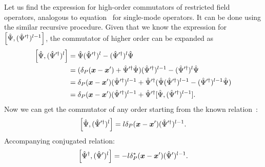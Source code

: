 Let us find the expression for high-order commutators of restricted field operators, analogous to equation~ for single-mode operators.
It can be done using the similar recursive procedure.
Given that we know the expression for $\left[ \hat{\Psi}, ( \hat{\Psi}^{\prime\dagger} )^{l-1} \right]$,
the commutator of higher order can be expanded as
\begin{equation*}
\begin{split}
	\left[ \hat{\Psi}, ( \hat{\Psi}^{\prime\dagger} )^l \right]
	& = \hat{\Psi} ( \hat{\Psi}^{\prime\dagger} )^l - ( \hat{\Psi}^{\prime\dagger} )^l \hat{\Psi} \\
	& = (
		\delta_P (\boldsymbol{x} - \boldsymbol{x}^\prime) + \hat{\Psi}^{\prime\dagger} \hat{\Psi}
	) ( \hat{\Psi}^{\prime\dagger} )^{l-1}
	- ( \hat{\Psi}^{\prime\dagger} )^l \hat{\Psi} \\
	& = \delta_P (\boldsymbol{x} - \boldsymbol{x}^\prime) ( \hat{\Psi}^{\prime\dagger} )^{l-1}
	+ \hat{\Psi}^{\prime\dagger} (
		\hat{\Psi} ( \hat{\Psi}^{\prime\dagger} )^{l-1}
		- ( \hat{\Psi}^{\prime\dagger} )^{l-1} \hat{\Psi}
	) \\
	& = \delta_P (\boldsymbol{x} - \boldsymbol{x}^\prime) ( \hat{\Psi}^{\prime\dagger} )^{l-1}
	+ \hat{\Psi}^{\prime\dagger} [
		\hat{\Psi}, ( \hat{\Psi}^{\prime\dagger} )^{l-1}
	].
\end{split}
\end{equation*}
Now we can get the commutator of any order starting from the known relation~:
\[
	\left[ \hat{\Psi}, ( \hat{\Psi}^{\prime\dagger} )^l \right]
	= l \delta_P (\boldsymbol{x} - \boldsymbol{x}^\prime) ( \hat{\Psi}^{\prime\dagger} )^{l-1}.
\]
Accompanying conjugated relation:
\[
	\left[ \hat{\Psi}^\dagger, ( \hat{\Psi}^\prime )^l \right]
	= - l \delta_P^* (\boldsymbol{x} - \boldsymbol{x}^\prime) ( \hat{\Psi}^\prime )^{l-1}.
\]

